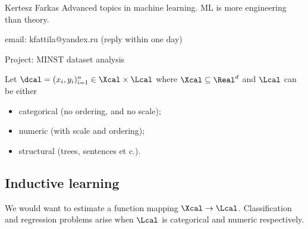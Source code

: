 Kertesz Farkas
Advanced topics in machine learning. ML is more engineering than theory.

email: kfattila@yandex.ru (reply within one day)

Project: MINST dataset analysis


Let $\dcal = (x_i,y_i)_{i=1}^n\in \Xcal\times \Lcal$ where $\Xcal \subseteq \Real^d$ and
$\Lcal$ can be either
\begin{itemize}
	\item categorical (no ordering, and no scale);
	\item numeric (with scale and ordering);
	\item structural (trees, sentences et c.).
\end{itemize}

\subsection{Inductive learning} %
\label{sub:inductive_learning}
We would want to estimate a function mapping $\Xcal \to \Lcal$. Classification and regression
problems arise when $\Lcal$ is categorical and numeric respectively.


	

